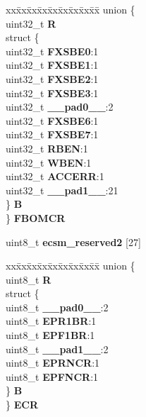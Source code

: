 \begin{DoxyCompactItemize}
\begin{tabbing}
\end{tabbing}\item 
\mbox{\label{structECSM__tag_a610167b8b1b8a6e5a642faa1ed4c4c9d}} 
\begin{tabbing}
xx\=xx\=xx\=xx\=xx\=xx\=xx\=xx\=xx\=\kill
union \{\\
\>uint32\_t {\bfseries R}\\
\>struct \{\\
\>\>uint32\_t {\bfseries FXSBE0}:1\\
\>\>uint32\_t {\bfseries FXSBE1}:1\\
\>\>uint32\_t {\bfseries FXSBE2}:1\\
\>\>uint32\_t {\bfseries FXSBE3}:1\\
\>\>uint32\_t {\bfseries \_\_pad0\_\_}:2\\
\>\>uint32\_t {\bfseries FXSBE6}:1\\
\>\>uint32\_t {\bfseries FXSBE7}:1\\
\>\>uint32\_t {\bfseries RBEN}:1\\
\>\>uint32\_t {\bfseries WBEN}:1\\
\>\>uint32\_t {\bfseries ACCERR}:1\\
\>\>uint32\_t {\bfseries \_\_pad1\_\_}:21\\
\>\} {\bfseries B}\\
\} {\bfseries FBOMCR}\\

\end{tabbing}\item 
\mbox{\label{structECSM__tag_a2c75e379f53bfab581db5669f16a881e}} 
uint8\+\_\+t {\bfseries ecsm\+\_\+reserved2} \mbox{[}27\mbox{]}
\item 
\mbox{\label{structECSM__tag_a08de74530b69e4c3098a3895e3bb51c8}} 
\begin{tabbing}
xx\=xx\=xx\=xx\=xx\=xx\=xx\=xx\=xx\=\kill
union \{\\
\>uint8\_t {\bfseries R}\\
\>struct \{\\
\>\>uint8\_t {\bfseries \_\_pad0\_\_}:2\\
\>\>uint8\_t {\bfseries EPR1BR}:1\\
\>\>uint8\_t {\bfseries EPF1BR}:1\\
\>\>uint8\_t {\bfseries \_\_pad1\_\_}:2\\
\>\>uint8\_t {\bfseries EPRNCR}:1\\
\>\>uint8\_t {\bfseries EPFNCR}:1\\
\>\} {\bfseries B}\\
\} {\bfseries ECR}\\


\end{tabbing}
\end{DoxyCompactItemize}
